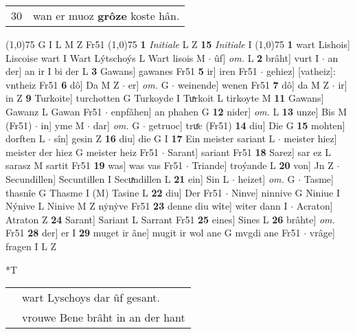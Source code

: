 \documentclass[8pt,a4paper,notitlepage]{article}
\begin{document}
\begin{table}[ht]
\begin{minipage}[t]{0.5\linewidth}
\begin{tabular}{rl}
30 & wan er muoz \textbf{grôze} koste hân.\\ 
\end{tabular}
\scriptsize
\line(1,0){75} \newline
G I L M Z Fr51 \newline
\line(1,0){75} \newline
\textbf{1} \textit{Initiale} L Z  \textbf{15} \textit{Initiale} I  \newline
\line(1,0){75} \newline
\textbf{1} wart Lishois] Liscoise wart I Wart Lýtschoýs L Wart lisois M  $\cdot$ ûf] \textit{om.} L \textbf{2} brâht] vurt I  $\cdot$ an der] an ir I bi der L \textbf{3} Gawans] gawanes Fr51 \textbf{5} ir] iren Fr51  $\cdot$ gehiez] [vatheiz]: vntheiz Fr51 \textbf{6} dô] Da M Z  $\cdot$ er] \textit{om.} G  $\cdot$ weinende] wenen Fr51 \textbf{7} dô] da M Z  $\cdot$ ir] in Z \textbf{9} Turkoite] turchotten G Turkoyde I Tuͯrkoit L tirkoyte M \textbf{11} Gawans] Gawanz L Gawan Fr51  $\cdot$ enpfâhen] an phahen G \textbf{12} nider] \textit{om.} L \textbf{13} unze] Bis M (Fr51)  $\cdot$ in] yme M  $\cdot$ dar] \textit{om.} G  $\cdot$ getruoc] truͤc (Fr51) \textbf{14} diu] Die G \textbf{15} mohten] dorften L  $\cdot$ sîn] gesin Z \textbf{16} diu] die G I \textbf{17} Ein meister sariant L  $\cdot$ meister hiez] meister der hiez G meister heiz Fr51  $\cdot$ Sarant] sariant Fr51 \textbf{18} Sarez] sar ez L sarasz M sartit Fr51 \textbf{19} was] was vas Fr51  $\cdot$ Triande] troýande L \textbf{20} von] Jn Z  $\cdot$ Secundillen] Secuntillen I Secuͯndillen L \textbf{21} ein] Sin L  $\cdot$ heizet] \textit{om.} G  $\cdot$ Tasme] thasnîe G Thasme I (M) Tasine L \textbf{22} diu] Der Fr51  $\cdot$ Ninve] ninnive G Niniue I Nýnive L Ninive M Z nẏnẏve Fr51 \textbf{23} denne diu wîte] witer dann I  $\cdot$ Acraton] Atraton Z \textbf{24} Sarant] Sariant L Sarrant Fr51 \textbf{25} eines] Sines L \textbf{26} brâhte] \textit{om.} Fr51 \textbf{28} der] er I \textbf{29} muget ir âne] mugit ir wol ane G mvgdi ane Fr51  $\cdot$ vrâge] fragen I L Z \newline
\end{minipage}
\hspace{0.5cm}
\begin{minipage}[t]{0.5\linewidth}
\small
\begin{center}*T
\end{center}
\begin{tabular}{rl}
 & wart Lyschoys dar ûf gesant.\\ 
 & vrouwe Bene brâht in an der hant\\ 

\end{tabular}
\end{minipage}
\end{table}
\end{document}
